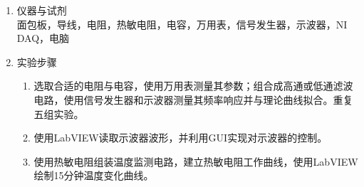 \documentclass[a4paper]{article}
\begin{document}
\begin{enumerate}[label=\chinese*.,left=0pt]
\begin{enumerate}[label=\arabic*.,left=0pt]
\begin{figure}[H]
\begin{minipage}{0.3\textwidth}
            \end{minipage}
            \caption{滤波电路和温度监测电路}
        \end{figure}
        \item 滤波电路 
        \\[1mm]
        以高通滤波器为例，电容$C$的阻抗为 $Z_C = -j/\omega C$，故
        $$ I = \frac{V_{\text{in}}}{Z_{\text{total}}}= \frac{V_{\text{in}}}{R - j / \omega C}= \frac{V_{\text{in}} (R + j / \omega C)}{R^2 + 1 / \omega^2 C^2} $$
        $$V_{\text{out}} = IR = \frac{V_{\text{in}} R (R + j / \omega C)}{R^2 + 1 / \omega^2 C^2}$$ 
        $$|V_{\text{out}}| = \left(V_{\text{out}}V_{\text{out}}^*\right)^{1/2} = \frac{V_{\text{in}} R}{\left[R^2 + (1/{\omega^2 C^2})\right]^{1/2}} = \frac{2 \pi f RC}{\left[1 + (2 \pi f RC)^2 \right]^{1/2}} V_{\text{in}}$$
        同理，对于低通滤波器，
        $$|V_{\text{out}}| = \frac{1}{\left[1 + (2 \pi f RC)^2 \right]^{1/2}} V_{\text{in}}$$
        两种电路的截止频率均为 $f_{\text{3dB}} = 1/2\pi RC$。

        \item 温度监测电路
        \\[1mm]
        电路如图所示，DAQ P0为数字信号输出端口，设置输出1时提供 $V_0=\qty{3.4}{\V}$，AI0为模拟信号输入端口，测量输入电压，GND 为接地端口；$R^*$ 为定值电阻，$R_\text{T}$ 为热敏电阻，其工作曲线满足
        $$\ln \frac{R_\text{T}}{R_0} = B \left(\frac{1}{T}-\frac{1}{T_0}\right)。$$
        由此可得温度-电压关系：
        $$T = \left[\frac{1}{T_0}+\frac{1}{B} \ln\left(\frac{R^*}{R_0} \frac{V}{V_0-V}\right)\right]^{-1}。$$

    \end{enumerate}
    \item 仪器与试剂
    \\[3mm]
    面包板，导线，电阻，热敏电阻，电容，万用表，信号发生器，示波器，NI DAQ，电脑

    \item 实验步骤
    \begin{enumerate}[label=\arabic*., left=0pt]
        \item 选取合适的电阻与电容，使用万用表测量其参数；组合成高通或低通滤波电路，使用信号发生器和示波器测量其频率响应并与理论曲线拟合。重复五组实验。
        \item 使用LabVIEW读取示波器波形，并利用GUI实现对示波器的控制。
        \item 使用热敏电阻组装温度监测电路，建立热敏电阻工作曲线，使用LabVIEW绘制15分钟温度变化曲线。
    \end{enumerate}
    

\end{enumerate}
\end{document}
